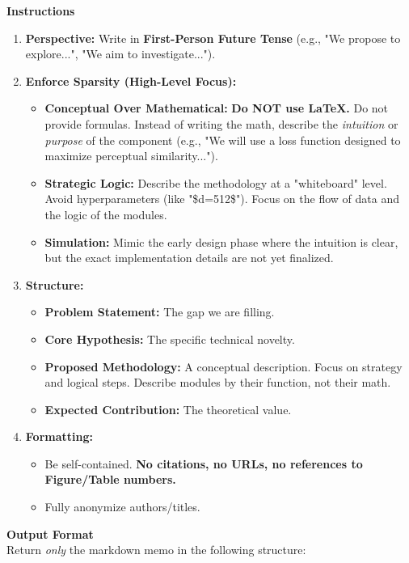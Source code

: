 \vspace{1em}
\noindent\textbf{Instructions}
\begin{enumerate}
    \item \textbf{Perspective:} Write in \textbf{First-Person Future Tense} (e.g., "We propose to explore...", "We aim to investigate...").
    \item \textbf{Enforce Sparsity (High-Level Focus):}
    \begin{itemize}
        \item \textbf{Conceptual Over Mathematical:} \textbf{Do NOT use LaTeX.} Do not provide formulas. Instead of writing the math, describe the \textit{intuition} or \textit{purpose} of the component (e.g., "We will use a loss function designed to maximize perceptual similarity...").
        \item \textbf{Strategic Logic:} Describe the methodology at a "whiteboard" level. Avoid hyperparameters (like "\$d=512\$"). Focus on the flow of data and the logic of the modules.
        \item \textbf{Simulation:} Mimic the early design phase where the intuition is clear, but the exact implementation details are not yet finalized.
    \end{itemize}
    \item \textbf{Structure:}
    \begin{itemize}
        \item \textbf{Problem Statement:} The gap we are filling.
        \item \textbf{Core Hypothesis:} The specific technical novelty.
        \item \textbf{Proposed Methodology:} A conceptual description. Focus on strategy and logical steps. Describe modules by their function, not their math.
        \item \textbf{Expected Contribution:} The theoretical value.
    \end{itemize}
    \item \textbf{Formatting:}
    \begin{itemize}
        \item Be self-contained. \textbf{No citations, no URLs, no references to Figure/Table numbers.}
        \item Fully anonymize authors/titles.
    \end{itemize}
\end{enumerate}

\vspace{1em}
\noindent\textbf{Output Format}\\
\vspace{0.5em}
Return \textit{only} the markdown memo in the following structure:

